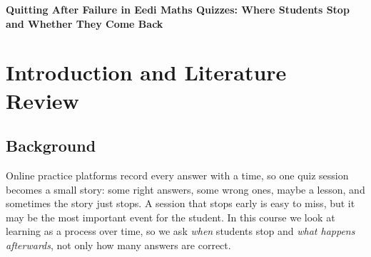 \documentclass[11pt,a4paper]{article}
\newcommand{\pp}{\,pp}
\begin{document}
\begin{center}{\large\bfseries Quitting After Failure in Eedi Maths Quizzes: Where Students Stop and Whether They Come Back}\end{center}\vspace{-3pt}
\begin{abstract}\small\noindent
We study what students do after they get a question wrong in short maths quizzes on the Eedi platform. The data has \nEventsScope{} timestamped steps from \nStudents{} students. We ask three questions. \textbf{RQ1:} Is the lesson step linked to learning? Students who read the lesson got the next question right more often than students who skipped it (\qOneEffRaw\pp{} higher in the raw data, \qOneEffFE\pp{} after comparing each student with themselves). \textbf{RQ2:} Where in a session does quitting concentrate? Mostly right after a wrong answer to the check-in retry: the session ends there \qTwoRateFR{} of the time, about \qTwoRatio{} times the rate at any other step. The drop in quitting later in a quiz is partly an illusion, because the students who keep going are the persistent ones. \textbf{RQ3:} Is quitting persistent, and do quitters return? A quit makes another quit \qThreeRatio{} times as likely next time, but most of that is the kind of student, not the last session. Students who quit after a failed retry usually return soon (median \qThreeMedFR) but fewer of them are back after a week than students who finished (\qThreeRetFRW{} vs.\ \qThreeRetDoneW).
\end{abstract}

\section{Introduction and Literature Review}
\subsection{Background}
Online practice platforms record every answer with a time, so one quiz session becomes a small story: some right answers, some wrong ones, maybe a lesson, and sometimes the story just stops. A session that stops early is easy to miss, but it may be the most important event for the student. In this course we look at learning as a process over time, so we ask \emph{when} students stop and \emph{what happens afterwards}, not only how many answers are correct.
\end{document}
